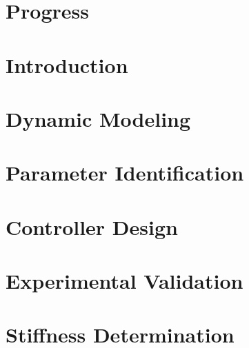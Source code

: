 \documentclass[12pt,twoside]{report}
\begin{document}

\thispagestyle{empty}



%

\tableofcontents

%






\chapter{Progress}


\chapter{Introduction}

\cleardoublepage

\chapter{Dynamic Modeling}


\chapter{Parameter Identification}



\chapter{Controller Design}



\chapter{Experimental Validation}





%




\newpage


\cleardoublepage

\appendix
\chapter{Stiffness Determination}

\end{document}
